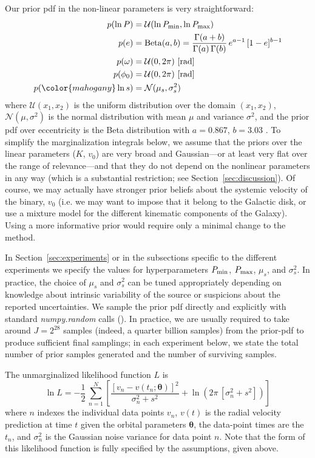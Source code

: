 \documentclass[manuscript, letterpaper]{aastex6}
\newcommand{\project}[1]{\textsl{#1}}
\newcommand{\sectionname}{Section}
\newcommand{\bs}[1]{\boldsymbol{#1}}
\newcommand{\resp}[1]{{\color{mahogany}#1}}
\begin{document}
Our prior pdf in the non-linear parameters is very straightforward:
\begin{align}
    p(\ln P) &= \mathcal{U}(\ln P_{\rm min}, \ln P_{\rm max})\\
    p(e) &= {\rm Beta}(a, b) = \frac{\Gamma(a+b)}{\Gamma(a) \, \Gamma(b)} \, e^{a-1} \, [1 - e]^{b-1}\\
    p(\omega) &= \mathcal{U}(0, 2\pi) ~ [{\rm rad}]\\
    p(\phi_0) &= \mathcal{U}(0, 2\pi) ~ [{\rm rad}]\\
    p(\resp{\ln s}) &= \mathcal{N}(\mu_s, \sigma^2_s)
\end{align}
where $\mathcal{U}(x_1, x_2)$ is the uniform distribution over the domain $(x_1,
x_2)$, $\mathcal{N}(\mu, \sigma^2)$ is the normal distribution with mean $\mu$
and variance $\sigma^2$, and the prior pdf over eccentricity is the Beta
distribution with $a=0.867$, $b=3.03$ \citep{Kipping:2013}.
\resp{To simplify the marginalization integrals below, we assume that the priors
over the linear parameters ($K$, $v_0$) are very broad and Gaussian---or at
least very flat over the range of relevance---and that they do not depend on the
nonlinear parameters in any way (which is a substantial restriction; see
\sectionname~\ref{sec:discussion}).
Of course, we may actually have stronger prior beliefs about the systemic
velocity of the binary, $v_0$ (i.e. we may want to impose that it belong to the
Galactic disk, or use a mixture model for the different kinematic components of
the Galaxy).
Using a more informative prior would require only a minimal change to the
method.}

In \sectionname~\ref{sec:experiments} or in the subsections specific to the
different experiments we specify the values for hyperparameters $P_{\rm min}$,
$P_{\rm max}$, $\mu_s$, and $\sigma^2_s$.
In practice, the choice of $\mu_s$ and $\sigma^2_s$ can be tuned appropriately
depending on knowledge about intrinsic variability of the source or suspicions
about the reported uncertainties.
We sample the prior pdf directly and explicitly with standard
\project{numpy.random} calls (\citealt{Van-der-Walt:2011}).
In practice, we are usually required to take around $J=2^{28}$ samples (indeed,
a quarter billion samples) from the prior-pdf to produce sufficient final
samplings; in each experiment below, we state  the total number of prior samples
generated and the number of surviving samples.

The unmarginalized likelihood function $L$ is
\begin{equation}
\ln L = -\frac{1}{2}\,\sum_{n=1}^N \left[\frac{[v_n - v(t_n;\bs{\theta})]^2}{\sigma_n^2 + s^2}
 +\ln \left(2\pi\,[\sigma_n^2 + s^2]\right) \right]
\end{equation}
where $n$ indexes the individual data points $v_n$, $v(t)$ is the radial
velocity prediction at time $t$ given the orbital parameters $\bs{\theta}$, the
data-point times are the $t_n$, and $\sigma_n^2$ is the Gaussian noise variance
for data point $n$.
Note that the form of this likelihood function is fully specified by the
assumptions, given above.
\end{document}
